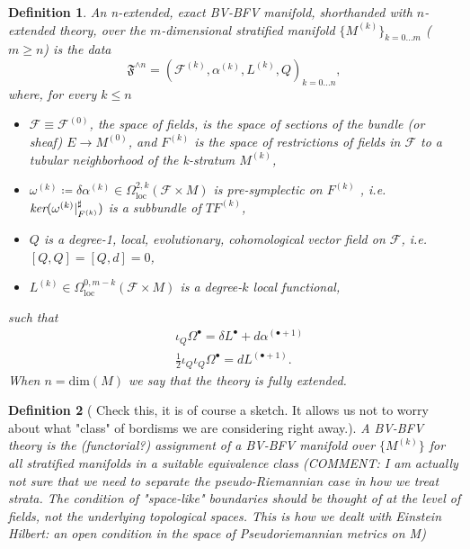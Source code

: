 \documentclass[a4paper,reqno]{amsart}
\newtheorem{definition}{Definition}
\begin{document}
\begin{definition}
An n-extended, exact BV-BFV manifold, shorthanded with \emph{$n$-extended theory}, over the $m$-dimensional stratified manifold $\{M^{(k)}\}_{k=0\dots m}$ ($m\geq n$) is the data 
$$\mathfrak{F}^{\wedge n}=(\mathcal{F}^{(k)}, \alpha^{(k)},L^{(k)}, Q)_{k=0\dots n},$$
where, for every $k\leq n$
\begin{itemize}
\item $\mathcal{F}\equiv\mathcal{F}^{(0)}$, the \emph{space of fields}, is the space of sections of the bundle (or sheaf) $E\longrightarrow M^{(0)}$, and $F^{(k)}$ is the space of restrictions of fields in $\mathcal{F}$ to a tubular neighborhood of the k-stratum $M^{(k)}$,
\item $\omega^{(k)}\coloneqq\delta\alpha^{(k)}\in\Omega_{\mathrm{loc}}^{2,k}(\mathcal{F}\times M)$ is pre-symplectic on $F^{(k)}$ , i.e. $\emph{ker}(\omega^{(k)}\vert_{F^{(k)}}^\sharp)$ is a subbundle of $TF^{(k)}$,
\item $Q$ is a degree-1, local, evolutionary, cohomological vector field on $\mathcal{F}$, i.e. $[Q,Q]=[Q,d]=0$, 
\item $L^{(k)}\in \Omega_{\mathrm{loc}}^{0,m-k}(\mathcal{F}\times M)$ is a degree-$k$ local functional,
\end{itemize}
such that
\begin{subequations}\label{CMReqts}\begin{align}
&  \iota_{Q} \Omega^{\bullet} = \delta L^{\bullet} + d\alpha^{(\bullet + 1)}\\\label{bracket}
&\frac12 \iota_Q\iota_Q\Omega^\bullet = d L^{(\bullet+1)}.
\end{align}\end{subequations}
When $n=\mathrm{dim}(M)$ we say that the theory is \emph{fully extended}.
\end{definition}


\begin{definition}[{\color{blue} Check this, it is of course a sketch. It allows us not to worry about what "class" of bordisms we are considering right away.}]
A BV-BFV theory is the (functorial?) assignment of a BV-BFV manifold over $\{M^{(k)}\}$ for all stratified manifolds {\color{blue} in a suitable equivalence class (COMMENT: I am actually not sure that we need to separate the pseudo-Riemannian case in how we treat strata. The condition of "space-like" boundaries should be thought of at the level of fields, not the underlying topological spaces. This is how we dealt with Einstein Hilbert: an open condition in the space of Pseudoriemannian metrics on M)}
\end{definition}
\end{document}
